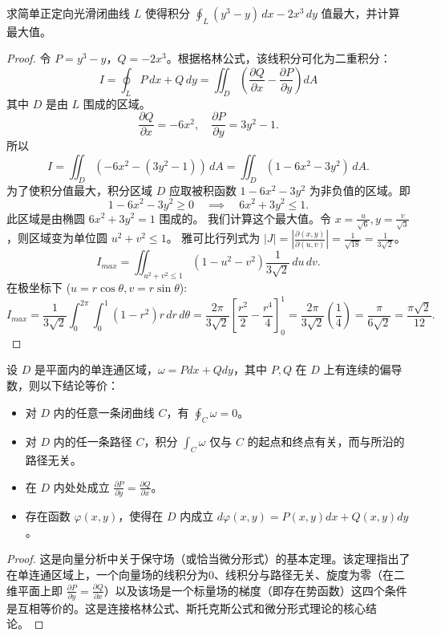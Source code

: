 \documentclass[lang=cn,10pt,thmcnt=section]{elegantbook}
\begin{document}
\begin{example}
    求简单正定向光滑闭曲线 $L$ 使得积分 $\oint_{L} (y^3 - y) \, dx - 2x^3 \, dy$ 值最大，并计算最大值。
\end{example}
\begin{proof}
    令 $P = y^3 - y$，$Q = -2x^3$。根据格林公式，该线积分可化为二重积分：
    \[
    I = \oint_L P \, dx + Q \, dy = \iint_D \left(\frac{\partial Q}{\partial x} - \frac{\partial P}{\partial y}\right) dA
    \]
    其中 $D$ 是由 $L$ 围成的区域。
    \[
    \frac{\partial Q}{\partial x} = -6x^2, \quad \frac{\partial P}{\partial y} = 3y^2 - 1.
    \]
    所以
    \[
    I = \iint_D (-6x^2 - (3y^2 - 1)) \, dA = \iint_D (1 - 6x^2 - 3y^2) \, dA.
    \]
    为了使积分值最大，积分区域 $D$ 应取被积函数 $1 - 6x^2 - 3y^2$ 为非负值的区域。即
    \[
    1 - 6x^2 - 3y^2 \ge 0 \quad \implies \quad 6x^2 + 3y^2 \le 1.
    \]
    此区域是由椭圆 $6x^2+3y^2=1$ 围成的。
    我们计算这个最大值。令 $x = \frac{u}{\sqrt{6}}, y = \frac{v}{\sqrt{3}}$，则区域变为单位圆 $u^2+v^2 \le 1$。
    雅可比行列式为 $|J| = \left| \frac{\partial(x,y)}{\partial(u,v)} \right| = \frac{1}{\sqrt{18}} = \frac{1}{3\sqrt{2}}$。
    \[
    I_{max} = \iint_{u^2+v^2 \le 1} (1 - u^2 - v^2) \frac{1}{3\sqrt{2}} \, du \, dv.
    \]
    在极坐标下 ($u=r\cos\theta, v=r\sin\theta$):
    \[
    I_{max} = \frac{1}{3\sqrt{2}} \int_0^{2\pi} \int_0^1 (1-r^2) r \, dr \, d\theta = \frac{2\pi}{3\sqrt{2}} \left[ \frac{r^2}{2} - \frac{r^4}{4} \right]_0^1 = \frac{2\pi}{3\sqrt{2}} \left(\frac{1}{4}\right) = \frac{\pi}{6\sqrt{2}} = \frac{\pi\sqrt{2}}{12}.
    \]
\end{proof}

\begin{example}
    设 $D$ 是平面内的单连通区域，$\omega = P dx + Q dy$，其中 $P, Q$ 在 $D$ 上有连续的偏导数，则以下结论等价：
\begin{itemize}
\item 对 $D$ 内的任意一条闭曲线 $C$，有 $\oint_{C} \omega = 0$。
\item 对 $D$ 内的任一条路径 $C$，积分 $\int_{C} \omega$ 仅与 $C$ 的起点和终点有关，而与所沿的路径无关。
\item 在 $D$ 内处处成立 $\frac{\partial P}{\partial y} = \frac{\partial Q}{\partial x}$。
\item 存在函数 $\varphi(x, y)$，使得在 $D$ 内成立 $d\varphi(x, y) = P(x, y) dx + Q(x, y) dy$。
\end{itemize}
\end{example}
\begin{proof}
    这是向量分析中关于保守场（或恰当微分形式）的基本定理。该定理指出了在单连通区域上，一个向量场的线积分为0、线积分与路径无关、旋度为零（在二维平面上即 $\frac{\partial P}{\partial y} = \frac{\partial Q}{\partial x}$）以及该场是一个标量场的梯度（即存在势函数）这四个条件是互相等价的。这是连接格林公式、斯托克斯公式和微分形式理论的核心结论。
\end{proof}
\end{document}
